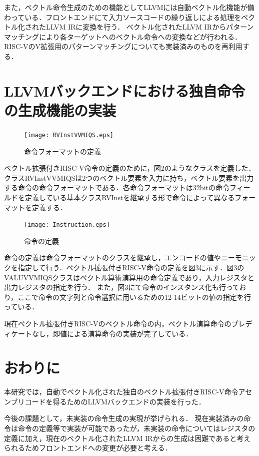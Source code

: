 \documentclass[a4paper,9pt, twocolumn]{jarticle}
\begin{document}
また，ベクトル命令生成のための機能としてLLVMには自動ベクトル化機能が備わっている．フロントエンドにて入力ソースコードの繰り返しによる処理をベクトル化されたLLVM IRに変換を行う．
ベクトル化されたLLVM IRからパターンマッチングにより各ターゲットへのベクトル命令への変換などが行われる．RISC-VのV拡張用のパターンマッチングについても実装済みのものを再利用する．

\section{LLVMバックエンドにおける独自命令の生成機能の実装}

\begin{figure}[t]
    \centering
        \texttt{[image: RVInstVVMIQS.eps]}
    \caption{命令フォーマットの定義}
    \label{fig:Instruciton_format}
\end{figure}

ベクトル拡張付きRISC-V命令の定義のために，図2のようなクラスを定義した．クラスRVInstVVMIQSは2つのベクトル要素を入力に持ち，ベクトル要素を出力する命令の命令フォーマットである．各命令フォーマットは32bitの命令フィールドを定義している基本クラスRVInstを継承する形で命令によって異なるフォーマットを定義する．

\begin{figure}[t]
    \centering
        \texttt{[image: Instruction.eps]}
    \caption{命令の定義}
    \label{fig:Instruciton}
\end{figure}

命令の定義は命令フォーマットのクラスを継承し，エンコードの値やニーモニックを指定して行う．ベクトル拡張付きRISC-V命令の定義を図3に示す．図3のVALUVVMIQSクラスはベクトル算術演算用の命令定義であり，入力レジスタと出力レジスタの指定を行う．
また，図3にて命令のインスタンス化も行っており，ここで命令の文字列と命令選択に用いるための12-14ビットの値の指定を行っている．

現在ベクトル拡張付きRISC-Vのベクトル命令の内，ベクトル演算命令のプレディケートなし，即値による演算命令の実装が完了している．

\section{おわりに}
本研究では，自動でベクトル化された独自のベクトル拡張付きRISC-V命令アセンブリコードを得るためのLLVMバックエンドの実装を行った．

今後の課題として，未実装の命令生成の実現が挙げられる．
現在実装済みの命令は命令の定義等で実装が可能であったが，未実装の命令についてはレジスタの定義に加え，現在のベクトル化されたLLVM IRからの生成は困難であると考えられるためフロントエンドへの変更が必要と考える．
\end{document}
